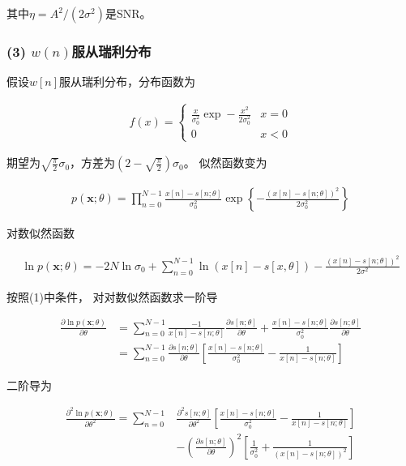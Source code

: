 \documentclass[fontset=windows]{article}
\numberwithin{figure}{section}
\begin{document}
其中\(\eta=A^2/(2\sigma^2)\)是SNR。
\subsubsection*{(3) \(w(n)\)服从瑞利分布}
假设\(w[n]\)服从瑞利分布，分布函数为

\begin{align*}
	f(x)=\left\{
	\begin{matrix}
		\frac{x}{\sigma_0^2} \exp -\frac{x^2}{2\sigma_0 ^2} & x = 0 \\
		0                                                   & x<0
	\end{matrix}
	\right.
\end{align*}

期望为\(\sqrt{\frac{\pi}{2}}\sigma_0\)，方差为\((2-\sqrt{\frac{\pi}{2}})\sigma_0\)。
似然函数变为

\begin{align*}
	p(\mathbf{x};\theta)=\prod_{n=0}^{N-1}\frac{x[n]-s[n;\theta]}{\sigma_0^2}
	\exp \left\{ -\frac{(x[n]-s[n;\theta])^2}{2\sigma_0^2}\right\}
\end{align*}

对数似然函数

\begin{align*}
	\ln p(\mathbf{x};\theta)=-2N\ln \sigma_0+\sum_{n=0}^{N-1}\ln (x[n]-s[x,\theta])
	-\frac{(x[n]-s[n;\theta])^2}{2\sigma^2}
\end{align*}

按照(1)中条件，
对对数似然函数求一阶导

\begin{align*}
	\frac{\partial \ln p(\mathbf{x};\theta)}{\partial \theta}
	 & =\sum_{n=0}^{N-1}\frac{-1}{x[n]-s[n;\theta]}\frac{\partial s[n;\theta]}{\partial \theta}
	+\frac{x[n]-s[n;\theta]}{\sigma_0^2}\frac{\partial s[n;\theta]}{\partial \theta}            \\
	 & =\sum_{n=0}^{N-1}\frac{\partial s[n;\theta]}{\partial \theta}
	\left[\frac{x[n]-s[n;\theta]}{\sigma_0^2}-\frac{1}{x[n]-s[n;\theta]}\right]
\end{align*}

二阶导为

\begin{align*}
	\frac{\partial^2 \ln p(\mathbf{x};\theta)}{\partial \theta^2}=
	\sum_{n=0}^{N-1} & \frac{\partial^2 s[n;\theta]}{\partial \theta^2}
	\left[\frac{x[n]-s[n;\theta]}{\sigma_0^2}-\frac{1}{x[n]-s[n;\theta]}\right]     \\
	                 & -\left(\frac{\partial s[n;\theta]}{\partial \theta}\right)^2
	\left[\frac{1}{\sigma_0^2}+\frac{1}{(x[n]-s[n;\theta])^2}\right]
\end{align*}
\end{document}
